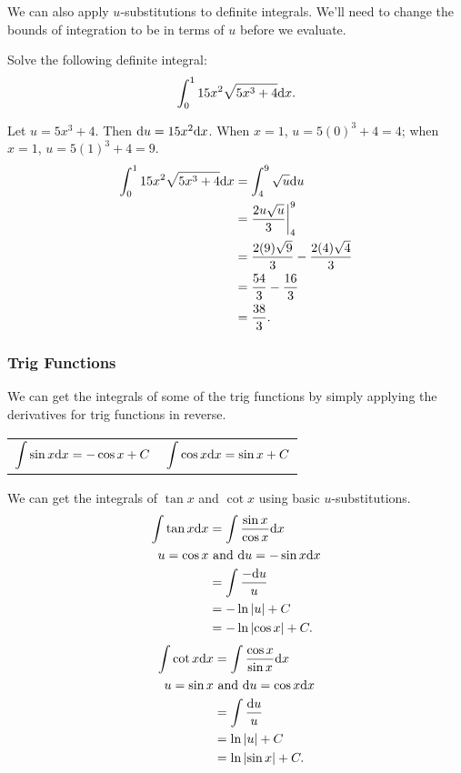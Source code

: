 \noindent
We can also apply $u$-substitutions to definite integrals.
We'll need to change the bounds of integration to be in terms of $u$ before we evaluate.
\begin{example}
	Solve the following definite integral:
	\begin{equation*}
		\int_{0}^{1}{15x^2\sqrt{5x^3+4}\mathrm{d} x}.
	\end{equation*}
\end{example}
Let $u = 5x^3 + 4$.
Then $\mathrm{d} u = 15x^2\mathrm{d} x$.
When $x=1$, $u=5(0)^3 + 4 = 4$; when $x=1$, $u = 5(1)^3  +4 = 9$.
\begin{align*}
	\int_{0}^{1}{15x^2\sqrt{5x^3+4}\mathrm{d} x} &= \int_{4}^{9}{\sqrt{u}\mathrm{d} u} \\
	&= \frac{2u\sqrt{u}}{3} \biggr\rvert_{4}^{9} \\
	&= \frac{2(9)\sqrt{9}}{3} - \frac{2(4)\sqrt{4}}{3} \\
	&= \frac{54}{3} - \frac{16}{3} \\
	&= \frac{38}{3}.
\end{align*}

\subsubsection{Trig Functions}
We can get the integrals of some of the trig functions by simply applying the derivatives for trig functions in reverse.
\begin{table}[H]
	\begin{center}
		\begin{tabular}{ l l }
			$\begin{aligned}\int{\sin{x}\mathrm{d} x}=-\cos{x} + C\end{aligned}$ & $\begin{aligned}\int{\cos{x}\mathrm{d} x}=\sin{x}+C\end{aligned}$
		\end{tabular}
	\end{center}
\end{table}

\noindent
We can get the integrals of $\tan{x}$ and $\cot{x}$ using basic $u$-substitutions.
\begin{align*}
	\int{\tan{x}\mathrm{d} x} &= \int{\frac{\sin{x}}{\cos{x}}\mathrm{d} x} \\
	u = \cos{x} &\text{ and } \mathrm{d} u = -\sin{x}\mathrm{d} x \\
	&= \int{\frac{-\mathrm{d} u}{u}} \\
	&= -\ln{\lvert u \rvert} + C \\
	&= -\ln{\lvert \cos{x} \rvert} + C.
\end{align*}
\begin{align*}
	\int{\cot{x}\mathrm{d} x} &= \int{\frac{\cos{x}}{\sin{x}}\mathrm{d} x} \\
	u = \sin{x} &\text{ and } \mathrm{d} u = \cos{x}\mathrm{d} x \\
	&= \int{\frac{\mathrm{d} u}{u}} \\
	&= \ln{\lvert u \rvert} + C \\
	&= \ln{\lvert \sin{x} \rvert} + C.
\end{align*}


